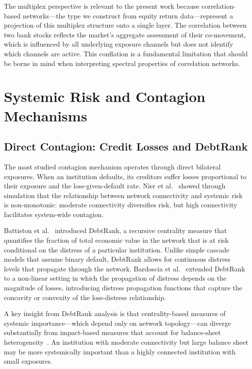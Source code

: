 The multiplex perspective is relevant to the present work because
correlation-based networks---the type we construct from equity return
data---represent a projection of this multiplex structure onto a single
layer.  The correlation between two bank stocks reflects the market's
aggregate assessment of their co-movement, which is influenced by all
underlying exposure channels but does not identify which channels are
active.  This conflation is a fundamental limitation that should be borne
in mind when interpreting spectral properties of correlation networks.


\section{Systemic Risk and Contagion Mechanisms}
\label{sec:systemic_risk}

\subsection{Direct Contagion: Credit Losses and DebtRank}
\label{sec:direct_contagion}

The most studied contagion mechanism operates through direct bilateral
exposures.  When an institution defaults, its creditors suffer losses
proportional to their exposure and the loss-given-default rate.  Nier
et al.~\cite{nier2007network} showed through simulation that the
relationship between network connectivity and systemic risk is
non-monotonic: moderate connectivity diversifies risk, but high
connectivity facilitates system-wide contagion.

Battiston et al.~\cite{battiston2012debtrank} introduced DebtRank, a
recursive centrality measure that quantifies the fraction of total
economic value in the network that is at risk conditional on the distress
of a particular institution.  Unlike simple cascade models that assume
binary default, DebtRank allows for continuous distress levels that
propagate through the network.  Bardoscia et
al.~\cite{bardoscia2017distress} extended DebtRank to a non-linear
setting in which the propagation of distress depends on the magnitude of
losses, introducing distress propagation functions that capture the
concavity or convexity of the loss-distress relationship.

A key insight from DebtRank analysis is that centrality-based measures of
systemic importance---which depend only on network topology---can diverge
substantially from impact-based measures that account for balance-sheet
heterogeneity~\cite{battiston2009liaisons}.  An institution with
moderate connectivity but large balance sheet may be more systemically
important than a highly connected institution with small exposures.

